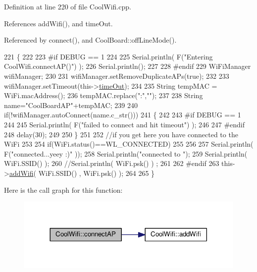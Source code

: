 Definition at line 220 of file Cool\+Wifi.\+cpp.



References add\+Wifi(), and time\+Out.



Referenced by connect(), and Cool\+Board\+::off\+Line\+Mode().


\begin{DoxyCode}
221 \{
222 
223 \textcolor{preprocessor}{#if DEBUG == 1 }
224     
225     Serial.println( F(\textcolor{stringliteral}{"Entering CoolWifi.connectAP()"}) );   
226     Serial.println();
227 
228 \textcolor{preprocessor}{#endif}
229     WiFiManager wifiManager;
230     
231     wifiManager.setRemoveDuplicateAPs(\textcolor{keyword}{true});
232 
233     wifiManager.setTimeout(this->\hyperlink{classCoolWifi_a952111605f25156588b5632caaba1c6f}{timeOut});
234     
235     String tempMAC = WiFi.macAddress();
236     tempMAC.replace(\textcolor{stringliteral}{":"},\textcolor{stringliteral}{""});
237 
238     String name=\textcolor{stringliteral}{"CoolBoardAP"}+tempMAC;  
239 
240     \textcolor{keywordflow}{if}(!wifiManager.autoConnect(name.c\_str())) 
241     \{
242     
243 \textcolor{preprocessor}{    #if DEBUG == 1}
244 
245         Serial.println( F(\textcolor{stringliteral}{"failed to connect and hit timeout"}) );
246     
247 \textcolor{preprocessor}{    #endif}
248         delay(30);
249 
250     \} 
251 
252     \textcolor{comment}{//if you get here you have connected to the WiFi}
253 
254     \textcolor{keywordflow}{if}(WiFi.status()==WL\_CONNECTED)
255 
256 
257             Serial.println( F(\textcolor{stringliteral}{"connected...yeey :)"} ));
258             Serial.println(\textcolor{stringliteral}{"connected to "});
259             Serial.println( WiFi.SSID() );
260             \textcolor{comment}{//Serial.println( WiFi.psk() ) ;}
261             
262 \textcolor{preprocessor}{        #endif}
263             this->\hyperlink{classCoolWifi_a914d7a1df14dd6b75345fb614c34e9d6}{addWifi}( WiFi.SSID() , WiFi.psk() );
264         
265     \}
\end{DoxyCode}
Here is the call graph for this function\+:\nopagebreak
\begin{figure}[H]
\begin{center}
\leavevmode
\includegraphics[width=317pt]{classCoolWifi_a7c857f27161782f5ef1d62d552aff971_cgraph}
\end{center}
\end{figure}
